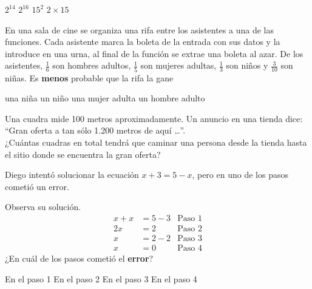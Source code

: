 \documentclass[10pt,letterpaper,addpoints]{exam}
\begin{document}
\begin{questions}
\begin{oneparchoices}
\CorrectChoice $2^{14}$
\choice $2^{16}$
\choice $15^{2}$
\choice $2\times 15$
\end{oneparchoices}
\question En una sala de cine se organiza una rifa entre los asistentes a una de las funciones. Cada asistente marca la boleta de la entrada con sus datos y la introduce en una urna, al final de la función se extrae una boleta al azar. De los asistentes, $\frac{1}{6}$ son hombres adultos, $\frac{1}{5}$ son mujeres adultas, $\frac{1}{3}$ son niños y  $\frac{3}{10}$     son niñas. Es \textbf{menos} probable que la rifa la gane

\begin{oneparchoices}
\choice una niña
\choice un niño
\choice una mujer adulta
\CorrectChoice un hombre adulto
\end{oneparchoices}
\question Una cuadra mide 100 metros aproximadamente. Un anuncio en una tienda dice: “Gran oferta a tan sólo 1.200 metros de aquí \ldots ”.\\ 

¿Cuántas cuadras en total tendrá que caminar una persona desde la tienda hasta el sitio donde se encuentra la gran oferta?

\begin{oneparchoices}
\end{oneparchoices}
\question Diego intentó solucionar la ecuación $x + 3 = 5 - x$, pero en uno de los pasos cometió un error.

Observa su solución.
\begin{align*}
 x+x&=5-3 & \mbox{Paso 1}\\
 2x&=2 & \mbox{Paso 2}\\
  x&=2-2 & \mbox{Paso 3}\\
  x&=0 & \mbox{Paso 4}
\end{align*}
¿En cuál de los pasos cometió el \textbf{error}?

\begin{oneparchoices}
\choice En el paso 1
\choice En el paso 2
\CorrectChoice En el paso 3
\choice En el paso 4
\end{oneparchoices}

\end{questions}
\end{document}
